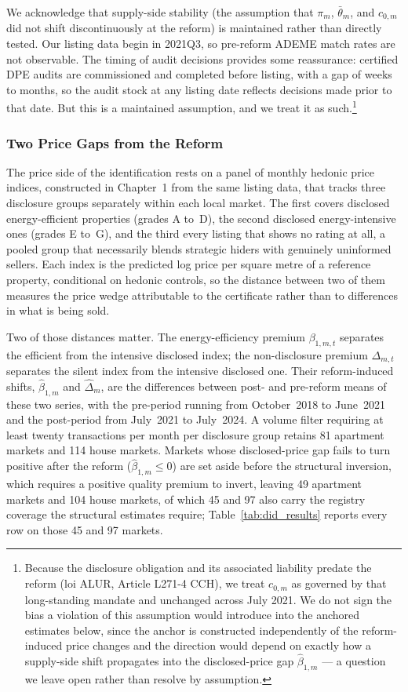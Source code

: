 We acknowledge that supply-side stability (the assumption that $\pi_m$, $\bar\theta_m$, and $c_{0,m}$ did not shift discontinuously at the reform) is maintained rather than directly tested. Our listing data begin in 2021Q3, so pre-reform ADEME match rates are not observable. The timing of audit decisions provides some reassurance: certified DPE audits are commissioned and completed before listing, with a gap of weeks to months, so the audit stock at any listing date reflects decisions made prior to that date. But this is a maintained assumption, and we treat it as such.\footnote{Because the disclosure obligation and its associated liability predate the reform (loi ALUR, Article L271-4 CCH), we treat $c_{0,m}$ as governed by that long-standing mandate and unchanged across July 2021. We do not sign the bias a violation of this assumption would introduce into the anchored estimates below, since the anchor is constructed independently of the reform-induced price changes and the direction would depend on exactly how a supply-side shift propagates into the disclosed-price gap $\hat\beta_{1,m}$ --- a question we leave open rather than resolve by assumption.}

\subsubsection{Two Price Gaps from the Reform}

The price side of the identification rests on a panel of monthly hedonic price indices, constructed in Chapter~1 from the same listing data, that tracks three disclosure groups separately within each local market. The first covers disclosed energy-efficient properties (grades A to~D), the second disclosed energy-intensive ones (grades E to~G), and the third every listing that shows no rating at all, a pooled group that necessarily blends strategic hiders with genuinely uninformed sellers. Each index is the predicted log price per square metre of a reference property, conditional on hedonic controls, so the distance between two of them measures the price wedge attributable to the certificate rather than to differences in what is being sold.

Two of those distances matter. The energy-efficiency premium $\beta_{1,m,t}$ separates the efficient from the intensive disclosed index; the non-disclosure premium $\Delta_{m,t}$ separates the silent index from the intensive disclosed one. Their reform-induced shifts, $\hat\beta_{1,m}$ and $\hat\Delta_m$, are the differences between post- and pre-reform means of these two series, with the pre-period running from October~2018 to June~2021 and the post-period from July~2021 to July~2024. A volume filter requiring at least twenty transactions per month per disclosure group retains 81 apartment markets and 114 house markets. Markets whose disclosed-price gap fails to turn positive after the reform ($\hat\beta_{1,m}\leq0$) are set aside before the structural inversion, which requires a positive quality premium to invert, leaving 49 apartment markets and 104 house markets, of which 45 and 97 also carry the registry coverage the structural estimates require; Table~\ref{tab:did_results} reports every row on those 45 and 97 markets.

